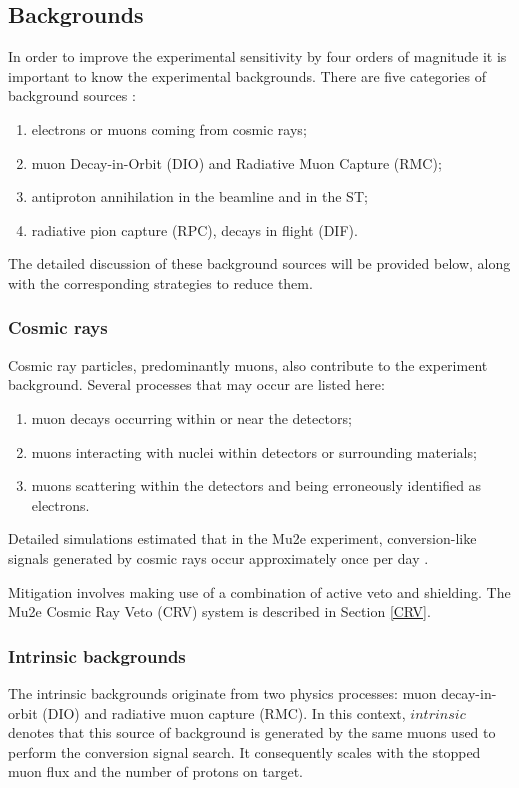 \subsection{Backgrounds}\label{backgrounds}
In order to improve the experimental sensitivity by four orders of magnitude 
it is important to know the experimental backgrounds. 
There are five categories of background 
sources \cite{bartoszek2015mu2e}:
\begin{enumerate}
\item electrons or muons coming from cosmic rays;
\item muon Decay-in-Orbit (DIO) and Radiative Muon Capture (RMC);
\item antiproton annihilation in the beamline and in the ST;
  \item radiative pion capture (RPC), decays in flight (DIF).
\end{enumerate}
  
The detailed discussion of these background sources will be provided below, along with the 
corresponding strategies to reduce  
them. 
\subsubsection{Cosmic rays}
Cosmic ray particles, predominantly muons, also contribute to the experiment 
background. Several processes that may occur are listed here:
\begin{enumerate}
    \item muon decays occurring within or near the detectors;
    \item muons interacting with nuclei within detectors or surrounding materials;
    \item muons scattering within the detectors and being erroneously identified as electrons.
    
\end{enumerate}

Detailed simulations estimated that in the Mu2e experiment, 
conversion-like signals generated by cosmic rays occur approximately once per day \cite{CRVposter}.

Mitigation involves making use of a combination of active veto and shielding.
The Mu2e Cosmic Ray Veto (CRV) system is described in Section \ref{CRV}.

\subsubsection{Intrinsic backgrounds}
The intrinsic backgrounds originate from two physics processes: 
muon decay-in-orbit (DIO) and radiative muon capture (RMC). In this context, 
$intrinsic$ denotes that this source of background is generated by the same muons
used to perform the conversion signal search. It consequently scales with the
stopped muon flux and the number of protons on target.


